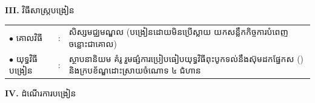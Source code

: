 \documentclass[a4paper,10pt]{article}
\begin{document}
{\vspace{1pt}

\textbf{III.} {\muol វិធីសាស្រ្តបង្រៀន}\\[1pt]
\hspace*{0.45cm}%
\begin{tabular}{@{}l l L{14.85cm}@{}}
  $\bullet$ \hspace{0.25cm} គោលវិធី & : & សិស្សមជ្ឈមណ្ឌល (បង្រៀនដោយមិនប្រើស្លាយ  យកសន្លឹកកិច្ចការបំពេញចន្លោះជាគោល) \\
  $\bullet$ \hspace{0.25cm} យុទ្ធវិធីបង្រៀន & : & ស្ថាបនានិយម គំរូ  រួមផ្សំការប្រៀបធៀបយុទ្ធវិធីពុះបូកទល់នឹងស៊ុមដកផ្នែកស () និងក្របខ័ណ្ឌដោះស្រាយចំណោទ ៤ ជំហាន  \\
\end{tabular}
}

\vspace{1pt}

\textbf{IV.} {\muol ដំណើរការបង្រៀន}

\vspace{1pt}
\end{document}
